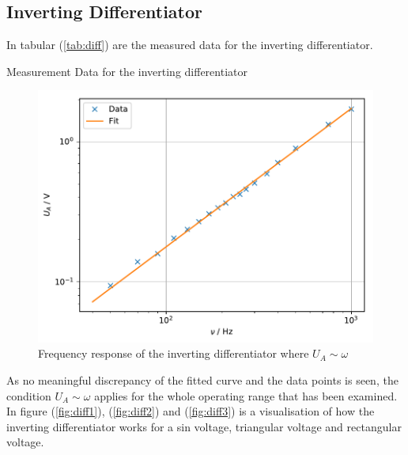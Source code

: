 \subsection{Inverting Differentiator}
In tabular (\ref{tab:diff}) are the measured data for the inverting differentiator.
\begin{table}[H]
  \centering
  \caption{Measurement Data for the inverting differentiator} \label{tab:diff}
\end{table}

\begin{figure}[H]
\centering
\includegraphics[scale=.75]{plot5.pdf}
\caption{Frequency response of the inverting differentiator where $U_A \sim \omega$}\label{fig:dif}
\end{figure}
\noindent
As no meaningful discrepancy of the fitted curve and the data points is seen, the condition $U_A \sim \omega$ applies for the
whole operating range that has been examined. \\ \noindent
In figure (\ref{fig:diff1}), (\ref{fig:diff2}) and (\ref{fig:diff3}) is a visualisation of how the inverting differentiator works for
a sin voltage, triangular voltage and rectangular voltage.
